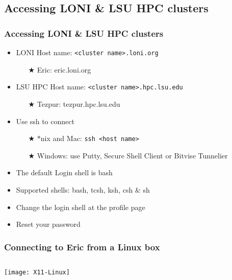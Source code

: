 \documentclass[slidestop,mathserif,compress,xcolor=svgnames,table]{beamer}
\newcommand*\vardiamond{\textcolor{tigerspurple}{%
  \ensuremath{\blacklozenge}}}
\begin{document}
\subsection{Accessing LONI \& LSU HPC clusters}
\begin{frame}
\frametitle{\small Accessing LONI \& LSU HPC clusters}
\begin{itemize}
\item LONI Host name: \texttt{<cluster name>.loni.org}
\begin{itemize}
\item[$\bigstar$] Eric: eric.loni.org
\end{itemize}
\item LSU HPC Host name: \texttt{<cluster name>.hpc.lsu.edu}
\begin{itemize}
\item[$\bigstar$] Tezpur: tezpur.hpc.lsu.edu
\end{itemize}
\item Use ssh to connect
\begin{itemize}
\item[$\bigstar$] $\ast$nix and Mac: \texttt{ssh <host name>}
\item[$\bigstar$] Windows: use Putty, Secure Shell Client or Bitvise Tunnelier
\end{itemize}
\item The default Login shell is bash
\item Supported shells: bash, tcsh, ksh, csh \& sh
\item Change the login shell at the profile page
\item Reset your password
\end{itemize}
\end{frame}

\begin{frame}
\frametitle{\small Connecting to Eric from a Linux box}
\vspace{-1.5cm}
\begin{columns}
\column{12cm}
\begin{center}
\texttt{[image: X11-Linux]}
\end{center}
\end{columns}
\end{frame}
\end{document}
